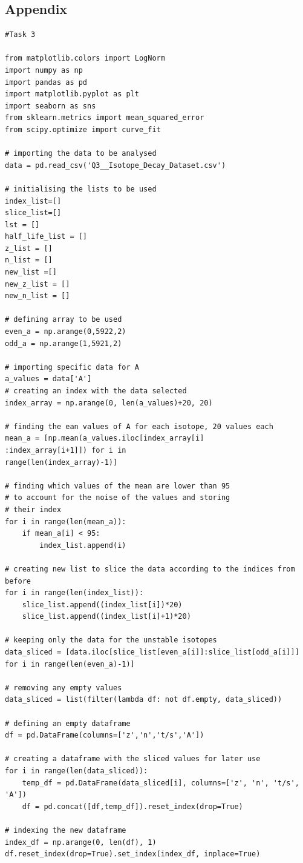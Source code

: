 \documentclass[12pt, a4paper]{article}
\begin{document}
\subsection{Appendix}
\begin{verbatim}
#Task 3

from matplotlib.colors import LogNorm
import numpy as np
import pandas as pd
import matplotlib.pyplot as plt
import seaborn as sns
from sklearn.metrics import mean_squared_error
from scipy.optimize import curve_fit

# importing the data to be analysed
data = pd.read_csv('Q3__Isotope_Decay_Dataset.csv')

# initialising the lists to be used
index_list=[]
slice_list=[]
lst = []
half_life_list = []
z_list = []
n_list = []
new_list =[]
new_z_list = []
new_n_list = []

# defining array to be used
even_a = np.arange(0,5922,2)
odd_a = np.arange(1,5921,2)

# importing specific data for A
a_values = data['A']
# creating an index with the data selected
index_array = np.arange(0, len(a_values)+20, 20)

# finding the ean values of A for each isotope, 20 values each
mean_a = [np.mean(a_values.iloc[index_array[i]
:index_array[i+1]]) for i in 
range(len(index_array)-1)]

# finding which values of the mean are lower than 95
# to account for the noise of the values and storing
# their index
for i in range(len(mean_a)):
    if mean_a[i] < 95:
        index_list.append(i)

# creating new list to slice the data according to the indices from before
for i in range(len(index_list)):
    slice_list.append((index_list[i])*20)
    slice_list.append((index_list[i]+1)*20)

# keeping only the data for the unstable isotopes
data_sliced = [data.iloc[slice_list[even_a[i]]:slice_list[odd_a[i]]] 
for i in range(len(even_a)-1)]

# removing any empty values
data_sliced = list(filter(lambda df: not df.empty, data_sliced))

# defining an empty dataframe
df = pd.DataFrame(columns=['z','n','t/s','A'])

# creating a dataframe with the sliced values for later use
for i in range(len(data_sliced)):
    temp_df = pd.DataFrame(data_sliced[i], columns=['z', 'n', 't/s', 'A'])
    df = pd.concat([df,temp_df]).reset_index(drop=True)

# indexing the new dataframe
index_df = np.arange(0, len(df), 1)
df.reset_index(drop=True).set_index(index_df, inplace=True)


\end{verbatim}
\end{document}
